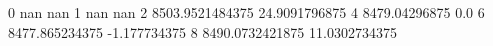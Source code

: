 0 nan nan
1 nan nan
2 8503.9521484375 24.9091796875
4 8479.04296875 0.0
6 8477.865234375 -1.177734375
8 8490.0732421875 11.0302734375

